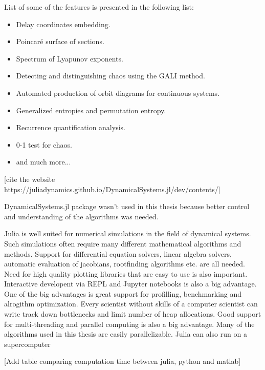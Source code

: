 List of some of the features is presented in the following list:
\begin{itemize}
    \item Delay coordinates embedding.
    \item Poincaré surface of sections.
    \item Spectrum of Lyapunov exponents.
    \item Detecting and distinguishing chaos using the GALI method.
    \item Automated production of orbit diagrams for continuous systems.
    \item Generalized entropies and permutation entropy.
    \item Recurrence quantification analysis.
    \item 0-1 test for chaos.
    \item and much more...
\end{itemize} [cite the website https://juliadynamics.github.io/DynamicalSystems.jl/dev/contents/]

DynamicalSystems.jl package wasn't used in this thesis because better control and understanding of the algorithms was needed.
\par
Julia is well suited for numerical simulations in the field of dynamical systems.
Such simulations often require many different mathematical algorithms and methods.
Support for differential equation solvers, linear algebra solvers, automatic evaluation of jacobians, rootfinding algorithms etc. are all needed.
Need for high quality plotting libraries that are easy to use is also important.
Interactive developent via REPL and Jupyter notebooks is also a big advantage.
One of the big advantages is great support for profilling, benchmarking and alrogithm optimization.
Every scientist without skills of a computer scientist can write track down bottlenecks and limit number of heap allocations.
Good support for multi-threading and parallel computing is also a big advantage.
Many of the algorithms used in this thesis are easily parallelizable.
Julia can also run on a supercomputer~\cite{Regier2016-vq}

[Add table comparing computation time between julia, python and matlab]

